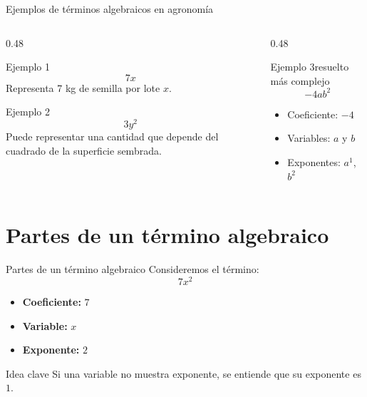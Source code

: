 \documentclass[aspectratio=169,12pt]{beamer}
\newcommand{\IdeaClave}[1]{
	\begin{alertblock}{Idea clave}
		#1
	\end{alertblock}
}
\begin{document}
	\begin{frame}{Ejemplos de términos algebraicos en agronomía}
		\begin{columns}[T]
			\begin{column}{0.48\textwidth}
				\begin{block}{Ejemplo 1}
					\[
					7x
					\]
					\pause
					Representa 7 kg de semilla por lote \(x\).
				\end{block}
				
				\pause
				\begin{block}{Ejemplo 2}
					\[
					3y^2
					\]
					\pause
					Puede representar una cantidad que depende del cuadrado de la superficie sembrada.
				\end{block}
			\end{column}
			
			\begin{column}{0.48\textwidth}
				\begin{exampleblock}{Ejemplo 3resuelto más complejo}
					\[
					-4ab^2
					\]
					\pause
					\begin{itemize}
						\item Coeficiente: \(-4\)
						\pause
						\item Variables: \(a\) y \(b\)
						\pause
						\item Exponentes: \(a^1\), \(b^2\)
					\end{itemize}
				\end{exampleblock}
			\end{column}
		\end{columns}
	\end{frame}
	
	\section{Partes de un término algebraico}
	\begin{frame}{Partes de un término algebraico}
		Consideremos el término:
		\[
		7x^2
		\]
		
		\pause
		\begin{itemize}
			\item \textbf{Coeficiente:} \(7\)
			\pause
			\item \textbf{Variable:} \(x\)
			\pause
			\item \textbf{Exponente:} \(2\)
		\end{itemize}
		
		\pause
		\IdeaClave{Si una variable no muestra exponente, se entiende que su exponente es \(1\).}
	\end{frame}
	
\end{document}
